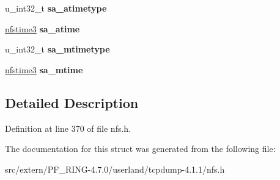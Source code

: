 \begin{DoxyCompactItemize}
\item 
\hypertarget{structnfsv3__sattr_a1282a365f005936952ff51784060e62b}{
u\_\-int32\_\-t {\bfseries sa\_\-atimetype}}
\label{structnfsv3__sattr_a1282a365f005936952ff51784060e62b}

\item 
\hypertarget{structnfsv3__sattr_ad9a73cd4cce2d6460b451b2c1bdbebf5}{
\hyperlink{structnfsv3__time}{nfstime3} {\bfseries sa\_\-atime}}
\label{structnfsv3__sattr_ad9a73cd4cce2d6460b451b2c1bdbebf5}

\item 
\hypertarget{structnfsv3__sattr_a92754ebe3e0963ff47f600f7d065517f}{
u\_\-int32\_\-t {\bfseries sa\_\-mtimetype}}
\label{structnfsv3__sattr_a92754ebe3e0963ff47f600f7d065517f}

\item 
\hypertarget{structnfsv3__sattr_aefdd5366761bf53ee869c8a59a12468d}{
\hyperlink{structnfsv3__time}{nfstime3} {\bfseries sa\_\-mtime}}
\label{structnfsv3__sattr_aefdd5366761bf53ee869c8a59a12468d}

\end{DoxyCompactItemize}


\subsection{Detailed Description}


Definition at line 370 of file nfs.h.



The documentation for this struct was generated from the following file:\begin{DoxyCompactItemize}
\item 
src/extern/PF\_\-RING-\/4.7.0/userland/tcpdump-\/4.1.1/nfs.h\end{DoxyCompactItemize}
